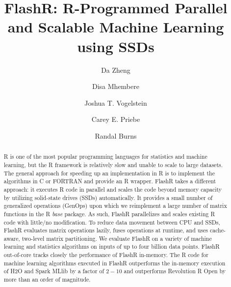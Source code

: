 \documentclass[sigconf]{acmart}
\begin{document}
\title{FlashR: R-Programmed Parallel and Scalable Machine Learning using SSDs}

\author{Da Zheng}

\author{Disa Mhembere}

\author{Joshua T. Vogelstein}

\author{Carey E. Priebe}

\author{Randal Burns}

\begin{abstract}
R is one of the most popular programming languages for statistics and machine
learning, but the R framework is relatively slow and unable to scale to large
datasets. The general approach for speeding up an implementation in R is to
implement the algorithms in C or FORTRAN and provide an R wrapper. FlashR takes
a different approach: it executes R code in parallel and scales the code beyond
memory capacity by utilizing solid-state drives (SSDs) automatically. It
provides a small number of generalized 
operations (GenOps) upon which we reimplement a large number of
matrix functions in the R \textit{base} package. As such, FlashR parallelizes
and scales existing R code with little/no modification. To reduce data movement
between CPU and SSDs, FlashR evaluates matrix operations lazily, fuses
operations at runtime, and uses cache-aware, two-level matrix partitioning.
We evaluate FlashR on a variety of machine learning and statistics algorithms 
on inputs of up to four billion data points.
FlashR out-of-core tracks closely the performance of FlashR in-memory.
The R code for machine learning algorithms executed in FlashR
outperforms the in-memory execution of H2O and Spark MLlib by a factor of
$2-10$ and outperforms Revolution R Open by more than an order of magnitude.
\end{abstract}
\end{document}
